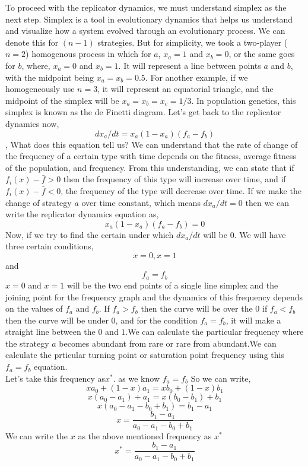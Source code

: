 \documentclass{article}
\begin{document}
To proceed with the replicator dynamics, we must understand simplex as the next step.
Simplex is a tool in evolutionary dynamics that helps us understand and visualize how a system evolved through an evolutionary process. We can denote this for $(n-1)$ strategies. But for simplicity, we took a two-player ($n=2$) homogenous process in which for $a$, $x_a=1$ and $x_b=0$, or the same goes for $b$, where, $x_a=0$ and $x_b=1$.
It will represent a line between points $a$ and $b$, with the midpoint being $x_a=x_b=0.5$. 
For another example, if we homogeneously use $ n=3$, it will represent an equatorial triangle, and the midpoint of the simplex will be $x_a=x_b=x_c=1/3$.
In population genetics, this simplex is known as the de Finetti diagram.
Let's get back to the replicator dynamics now,
\[dx_a/dt=x_a(1-x_a)(f_a-f_b)\],
What does this equation tell us? 
We can understand that the rate of change of the frequency of a certain type with time depends on the fitness, average fitness of the population, and frequency. From this understanding, we can state that if $f_i(x)-\bar{f}>0$ then the frequency of this type will increase over time, and if $f_i(x)-\bar{f}<0$, the frequency of the type will decrease over time.
If we make the change of strategy $a$ over time constant, which means $dx_a/dt=0$ then we can write the replicator dynamics equation as,
\[x_a(1-x_a)(f_a-f_b)=0\]
Now, if we try to find the certain under which $dx_a/dt$ will be $0$.
We will have three certain conditions,
\[x=0,x=1\] and \[f_a=f_b\]
$x=0$ and $x=1$ will be the two end points of a single line simplex and the joining point for the frequency graph and the dynamics of this frequency depends on the values of $f_a$ and $f_b$. If $f_a>f_b$ then the curve will be over the $0$ if $f_a<f_b$ then the curve will be under $0$, and for the condition $f_a=f_b$, it will make a straight line between the $0$ and $1$\cite{Bishop1976}.We can calculate the particular frequency where the strategy $a$ becomes abundant from rare or rare from abundant.We can calculate the prticular turning point or saturation point frequency using this $f_a=f_b$ equation.\\
Let's take this frequency as$x^*$.
as we know $f_a=f_b$
So we can write,
\[xa_0+(1-x)a_1=xb_0+(1-x)b_1\]
\[x(a_0-a_1)+a_1=x(b_0-b_1)+b_1\]
\[x(a_0-a_1-b_0+b_1)=b_1-a_1\]
\[x=\frac{b_1-a_1}{a_0-a_1-b_0+b_1}\]
We can write the $x$ as the above mentioned frequency as $x^*$
\[x^*=\frac{b_1-a_1}{a_0-a_1-b_0+b_1}\]
\end{document}

